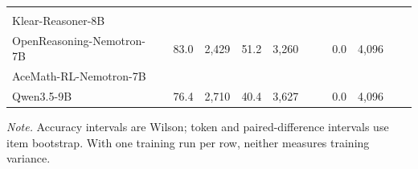 \begin{table}[!t]
{\begin{tabular}{@{}l cc cc cc cc cc@{}}
& \tbd{--} & \tbd{--} & \tbd{--} & \tbd{--}
& \tbd{--} & \tbd{--} & \tbd{--} & \tbd{--}
& \tbd{--} & \tbd{--} \\
Klear-Reasoner-8B~\citep{klearreasoner2025}
& \tbd{--} & \tbd{--} & \tbd{--} & \tbd{--}
& \tbd{--} & \tbd{--} & \tbd{--} & \tbd{--}
& \tbd{--} & \tbd{--} \\
OpenReasoning-Nemotron-7B~\citep{openreasoningnemotron7b}
& 83.0 & 2,429 & 51.2 & 3,260
& \tbd{--} & \tbd{--} & 0.0 & 4,096
& \tbd{--} & \tbd{--} \\
AceMath-RL-Nemotron-7B~\citep{acemathrlnemotron7b}
& \tbd{--} & \tbd{--} & \tbd{--} & \tbd{--}
& \tbd{--} & \tbd{--} & \tbd{--} & \tbd{--}
& \tbd{--} & \tbd{--} \\
Qwen3.5-9B~\citep{qwen35team2026}
& 76.4 & 2,710 & 40.4 & 3,627
& \tbd{--} & \tbd{--} & 0.0 & 4,096
& \tbd{--} & \tbd{--} \\
\bottomrule
\end{tabular}%
}

\vspace{3pt}
\parbox{\textwidth}{\footnotesize
\emph{Note.} Accuracy intervals are Wilson; token and paired-difference intervals use item
bootstrap. With one training run per row, neither measures training variance.
\par}
\end{table}


